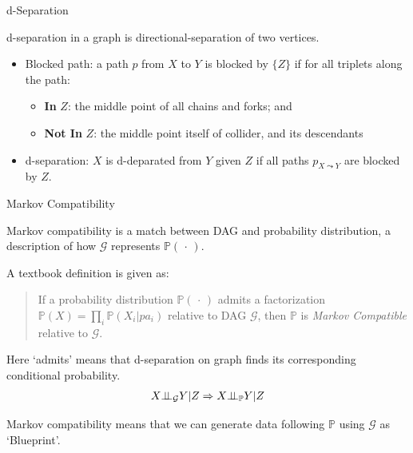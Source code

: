 \begin{point}
    d-Separation
\end{point}

d-separation in a graph is directional-separation of two vertices.

\begin{itemize}[topsep=2pt,itemsep=0pt]
    \item Blocked path: a path $ p $ from $ X $ to $ Y $ is blocked by $ \{Z\} $ if for all triplets along the path:
    \begin{itemize}[topsep=2pt,itemsep=0pt]
        \item \textbf{In} $ Z $: the middle point of all chains and forks; and
        \item \textbf{Not In} $ Z $: the middle point itself of collider, and its descendants
    \end{itemize}
    \item d-separation: $ X $ is d-deparated from $ Y $ given $ Z $ if all paths $ p_{X\leadsto Y} $ are blocked by $ Z $.
        
\end{itemize}

    

\begin{point}
    Markov Compatibility
\end{point}

Markov compatibility is a match between DAG and probability distribution, a description of how $ \mathcal{G} $ represents $ \mathbb{P}\left( \, \cdot \,  \right)  $.

A textbook definition is given as:
\begin{quote}
    If a probability distribution $ \mathbb{P}\left( \, \cdot \,  \right)  $ admits a factorization $ \mathbb{P}\left( X \right) = \prod_{i}\mathbb{P}\left( X_i|pa_i \right)  $ relative to DAG $ \mathcal{G} $, then $ \mathbb{P} $ is \textit{Markov Compatible} relative to $ \mathcal{G} $.
\end{quote}

Here `admits' means that d-separation on graph finds its corresponding conditional probability.
\begin{align*}
    X\bot\!\!\!\bot _\mathcal{G} Y|Z\Rightarrow  X\bot\!\!\!\bot _\mathbb{P} Y|Z
\end{align*}

Markov compatibility means that we can generate data following $ \mathbb{P} $ using $ \mathcal{G} $ as `Blueprint'.


